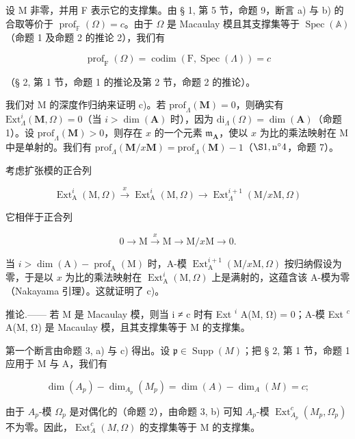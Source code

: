 设 M 非零，并用 F 表示它的支撑集。由 § 1, 第 5 节，命题 9，断言 a) 与 b) 的合取等价于 \(\operatorname{prof}_{\mathbb{F}}(\Omega)=c\)。由于 \(\Omega\) 是 Macaulay 模且其支撑集等于 \(\operatorname{Spec}(\mathbb{A})\)（命题 1 及命题 2 的推论 2），我们有

\[
\operatorname{prof} _ {\mathrm{F}} (\Omega) = \operatorname{codim} (\mathrm{F}, \operatorname{Spec} (\Lambda)) = c
\]

（§ 2, 第 1 节，命题 1 的推论及第 2 节，命题 2 的推论）。

我们对 M 的深度作归纳来证明 c)。若 \(\mathrm{prof}_{\Lambda}(\mathbf{M}) = 0\)，则确实有 \(\mathrm{Ext}_{\Lambda}^{i}(\mathbf{M},\Omega) = 0\)（当 \(i > \dim (\mathbf{A})\) 时），因为 \(\mathrm{di}_{\Lambda}(\Omega) = \dim (\mathbf{A})\)（命题 1）。设 \(\mathrm{prof}_{\Lambda}(\mathbf{M}) > 0\)，则存在 \(x\) 的一个元素 \(\mathfrak{m}_{\mathbf{A}}\)，使以 \(x\) 为比的乘法映射在 M 中是单射的。我们有 \(\mathrm{prof}_{\Lambda}(\mathbf{M} / x\mathbf{M}) = \mathrm{prof}_{\Lambda}(\mathbf{M}) - 1\)（\(\S 1, \mathrm{n}^{\circ}4\)，命题 7）。

考虑扩张模的正合列

\[
\operatorname{Ext} _ {\mathrm{A}} ^ {i} (\mathrm{M}, \Omega) \xrightarrow {x} \operatorname{Ext} _ {\mathrm{A}} ^ {i} (\mathrm{M}, \Omega) \longrightarrow \operatorname{Ext} _ {\Lambda} ^ {i + 1} (\mathrm{M} / x \mathrm{M}, \Omega)
\]

它相伴于正合列

\[
0 \to \mathrm{M} \xrightarrow {x} \mathrm{M} \longrightarrow \mathrm{M} / x \mathrm{M} \to 0.
\]

当 \(i > \dim(\mathrm{A}) - \operatorname{prof}_{\mathrm{A}}(\mathrm{M})\) 时，A-模 \(\operatorname{Ext}_{\mathrm{A}}^{i+1}(\mathrm{M}/x\mathrm{M},\Omega)\) 按归纳假设为零，于是以 \(x\) 为比的乘法映射在 \(\operatorname{Ext}_{\mathrm{A}}^{i}(\mathrm{M},\Omega)\) 上是满射的，这蕴含该 A-模为零（Nakayama 引理）。这就证明了 c)。

推论.—— 若 M 是 Macaulay 模，则当 i ≠ c 时有 Ext \(^{i}\) A(M, Ω) = 0；A-模 Ext \(^{c}\) A(M, Ω) 是 Macaulay 模，且其支撑集等于 M 的支撑集。

第一个断言由命题 3, a) 与 c) 得出。设 \(\mathfrak{p} \in \operatorname{Supp}(M)\)；把 § 2, 第 1 节，命题 1 应用于 M 与 A，我们有

\[
\dim (A _ {p}) - \dim_ {A _ {p}} (M _ {p}) = \dim (A) - \dim_ {A} (M) = c;
\]

由于 \(A_{p}\)-模 \(\Omega_{p}\) 是对偶化的（命题 2），由命题 3, b) 可知 \(A_{p}\)-模 \(\operatorname{Ext}_{A_{p}}^{c}(M_{p},\Omega_{p})\) 不为零。因此，\(\operatorname{Ext}_{A}^{c}(M,\Omega)\) 的支撑集等于 M 的支撑集。

